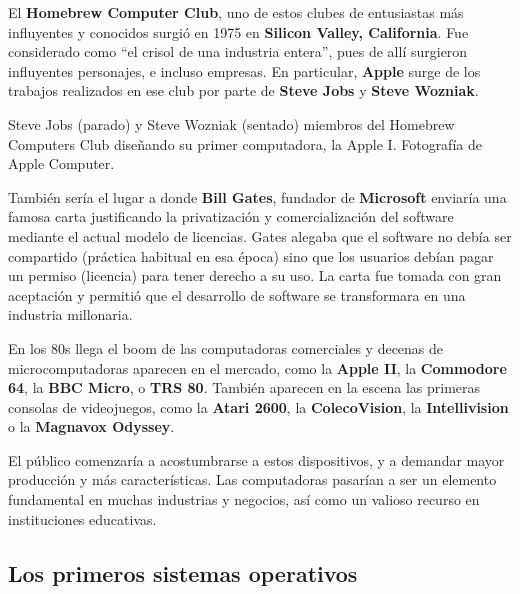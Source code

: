  El \textbf{Homebrew Computer Club}, uno de estos clubes de
entusiastas más influyentes y conocidos surgió en 1975 en \textbf{Silicon
Valley, California}. Fue considerado como ``el crisol de una industria entera'',
pues de allí surgieron influyentes personajes, e incluso empresas. En
particular, \textbf{Apple} surge de los trabajos realizados en ese club por
parte de \textbf{Steve Jobs} y \textbf{Steve Wozniak}.

{Steve Jobs (parado) y Steve Wozniak (sentado) miembros del Homebrew Computers
Club diseñando su primer computadora, la Apple I.} {Fotografía de Apple
Computer.}

 También sería el lugar a donde \textbf{Bill
Gates}, fundador de \textbf{Microsoft} enviaría una famosa carta justificando la
privatización y comercialización del software mediante el actual modelo de
licencias. Gates alegaba que el software no debía ser compartido (práctica
habitual en esa época) sino que los usuarios debían pagar un permiso (licencia)
para tener derecho a su uso. La carta fue tomada con gran aceptación y permitió
que el desarrollo de software se transformara en una industria millonaria.

 En los 80s llega
el boom de las computadoras comerciales y decenas de microcomputadoras aparecen
en el mercado, como la \textbf{Apple II}, la \textbf{Commodore 64}, la
\textbf{BBC Micro}, o \textbf{TRS 80}. También aparecen en la escena las
primeras consolas de videojuegos, como la \textbf{Atari 2600}, la
\textbf{ColecoVision}, la \textbf{Intellivision} o la \textbf{Magnavox Odyssey}.

El público comenzaría a acostumbrarse a estos dispositivos, y a demandar mayor
producción y más características. Las computadoras pasarían a ser un elemento
fundamental en muchas industrias y negocios, así como un valioso recurso en
instituciones educativas.

\subsection{Los primeros sistemas operativos}
\label{chap:historia_computadoras:subsec:sistemas_operativos}

